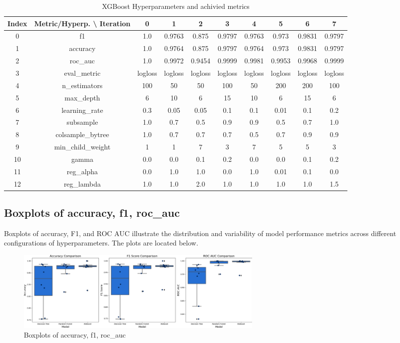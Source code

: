 \documentclass{article}%
\begin{document}
\begin{table}[h!]%
\caption{XGBoost Hyperparameters and achivied metrics}%
\vspace{0.2cm}%
\centering%
\begin{tabular}{|c||c||c||c||c||c||c||c||c||c|}%
\hline%
Index&Metric/Hyperp. \textbackslash{} Iteration&0&1&2&3&4&5&6&7\\%
\hline%
0&f1&1.0&0.9763&0.875&0.9797&0.9763&0.973&0.9831&0.9797\\%
1&accuracy&1.0&0.9764&0.875&0.9797&0.9764&0.973&0.9831&0.9797\\%
2&roc\_auc&1.0&0.9972&0.9454&0.9999&0.9981&0.9953&0.9968&0.9999\\%
3&eval\_metric&logloss&logloss&logloss&logloss&logloss&logloss&logloss&logloss\\%
4&n\_estimators&100&50&50&100&50&200&200&100\\%
5&max\_depth&6&10&6&15&10&6&15&6\\%
6&learning\_rate&0.3&0.05&0.05&0.1&0.1&0.01&0.1&0.2\\%
7&subsample&1.0&0.7&0.5&0.9&0.9&0.5&0.7&1.0\\%
8&colsample\_bytree&1.0&0.7&0.7&0.7&0.5&0.7&0.9&0.9\\%
9&min\_child\_weight&1&1&7&3&7&5&5&3\\%
10&gamma&0.0&0.0&0.1&0.2&0.0&0.0&0.1&0.2\\%
11&reg\_alpha&0.0&1.0&1.0&0.0&1.0&0.01&0.1&0.0\\%
12&reg\_lambda&1.0&1.0&2.0&1.0&1.0&1.0&1.0&1.5\\%
\hline%
\end{tabular}%
\end{table}

%
\newpage%
\subsection{Boxplots of accuracy, f1, roc\_auc}%
\label{subsec:Boxplotsofaccuracy,f1,rocauc}%
Boxplots of accuracy, F1, and ROC AUC illustrate the distribution and variability of model performance metrics across different configurations of hyperparameters. The plots are located below.%


\begin{figure}[h!]%
\centering%
\includegraphics[width=460px]{ModelOptimization/box_plots_metrics.png}%
\caption{Boxplots of accuracy, f1, roc\_auc}%
\end{figure}
\end{document}
